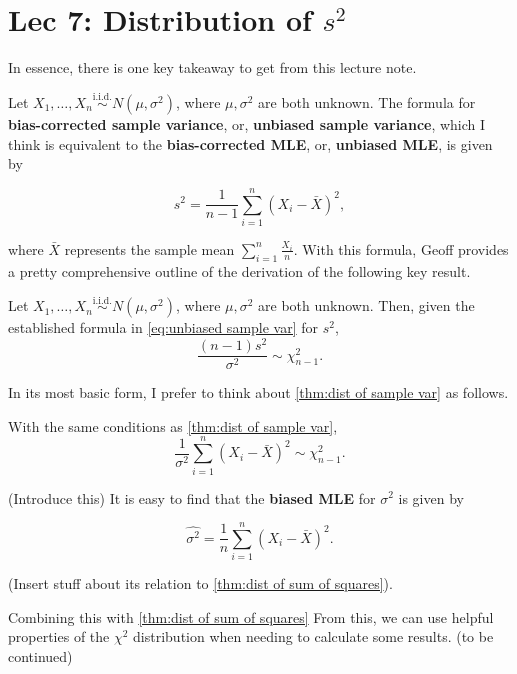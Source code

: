 \chapter[Lec 7: Distribution of s squared]{Lec 7: Distribution of \(s^2\)}\label{ch:Lec 7:dist of s squared}

In essence, there is one key takeaway to get from this lecture note.

\medskip 

Let \(X_1,\ldots,X_n \overset{\text{i.i.d.}}{\sim} N(\mu,\sigma^2)\), where \(\mu, \sigma^2\) are both unknown. 
The formula for \textbf{bias-corrected sample variance}, or, \textbf{unbiased sample variance}, which I think is equivalent to the \textbf{bias-corrected MLE}, or, \textbf{unbiased MLE}, is given by 

\begin{equation}\label{eq:unbiased sample var}
    s^2 = \frac{1}{n-1}\sum_{i=1}^{n}{(X_i - \bar{X})}^2,
\end{equation}

where \(\bar{X}\) represents the sample mean \(\sum_{i=1}^{n}\frac{X_i}{n}\). 
With this formula, Geoff provides a pretty comprehensive outline of the derivation of the following key result. 

\begin{theorem}\label{thm:dist of sample var}
    Let \(X_1,\ldots,X_n \overset{\text{i.i.d.}}{\sim} N(\mu,\sigma^2)\), where \(\mu, \sigma^2\) are both unknown.
    Then, given the established formula in \cref{eq:unbiased sample var} for \(s^2\), 
    \[\frac{(n-1)s^2}{\sigma^2} \sim \chi_{n-1}^{2}.\]
\end{theorem}

In its most basic form, I prefer to think about \cref{thm:dist of sample var} as follows. 

\begin{theorem}\label{thm:dist of sum of squares}
    With the same conditions as \cref{thm:dist of sample var},
    \[\frac{1}{\sigma^2}\sum_{i=1}^{n}{(X_i - \bar{X})}^2 \sim \chi_{n-1}^{2}.\]
\end{theorem}

(Introduce this)
It is easy to find that the \textbf{biased MLE} for \(\sigma^2\) is given by 

\begin{equation}\label{eq:biased MLE var}
    \hat{\sigma^2} = \frac{1}{n}\sum_{i=1}^{n}{(X_i - \bar{X})}^2.
\end{equation}

(Insert stuff about its relation to \cref{thm:dist of sum of squares}).


Combining this with \cref{thm:dist of sum of squares}
From this, we can use helpful properties of the \(\chi^2\) distribution when needing to calculate some results. 
(to be continued)